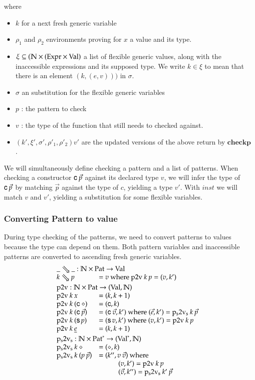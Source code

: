 where
\begin{itemize}
\item
$k$ for a next fresh generic variable
\item
$\rho_1$ and $\rho_2$ environments proving for $x$ a value and its type.
\item
$\xi \subseteq (\mathbb{N} \times (\mathrm{Expr} \times \mathrm{Val})$ a list of flexible generic values, along with the inaccessible expressions and its supposed type. We write $k \in \xi$ to mean that there is an element $(k,(e,v)))$ in $\sigma$. 
\item
$\sigma$ an substitution for the flexible generic variables
\item
$p$ : the pattern to check
\item
$v$ : the type of the function that still needs to checked against.
\item
$(k',\xi',\sigma',\rho'_1,\rho'_2){v'}$ are the updated versions of the above return by $\mathbf{checkp}$.
\end{itemize}

We will simultaneously define checking a pattern and a list of patterns.
When checking a constructor $\mathsf{c} \: \vec{p}$ against its declared type $v$,
we will infer the type of $\mathsf{c} \: \vec{p}$ by matching $\vec{p}$ against the type of $c$,
yielding a type $v'$. With $inst$ we will match $v$ and $v'$, yielding a substitution for some flexible variables.

\subsubsection{Converting Pattern to value}
During type checking of the patterns, we need to convert patterns to values because the type can depend on them.
Both pattern variables and inaccessible patterns are converted to ascending fresh generic variables.
\[
\begin{array}{ll}

\multicolumn{2}{l}{\ptv{\_}{\_}: \cN \times \Pat \ra \Val}\\
\ptv{k}{p} & = v \mbox{ where } \ptvx \: k \: p = (v,k')
\vs\\ 
\multicolumn{2}{l}{\ptvx : \cN \times \Pat \ra (\Val,\cN)}\\
\ptvx \: k \:x & = (k,k+1) \\
\ptvx \: k \: (\cc \: \diamond) & = (\cc,k) \\
\ptvx \: k \: (\cc \: \vec{p}) & = (\cc \: \vec{v},k') \mbox{ where } (\vec{e},k') = \pstvs \: k \: \vec{p}\\
\ptvx \: k \: (\s p) & = (\s v,k') \mbox{ where } (v,k') = \ptvx \: k \: p\\
\ptvx \: k \: \inacc{e} & = (k,k+1) 
\vs\\
\multicolumn{2}{l}{\pstvs : \cN \times \ves{\Pat} \ra (\ves{\Val},\cN)}\\
\pstvs \: k \: \diamond & = (\diamond,k) \\
\pstvs \: k \: (p \: \vec{p}) & = (k'', v \: \vec{v}) \mbox{ where } \\
& \spcx (v,k') = \ptvx \: k \: p \\
& \spcx (\vec{v},k'') = \pstvs \: k' \: \vec{p}  
\end{array}
\]

